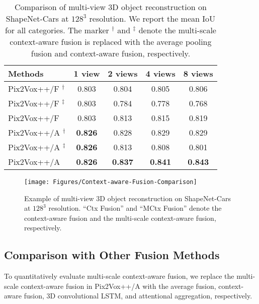 \documentclass[twocolumn]{svjour3}
\begin{document}
\begin{table}[!t]
  \centering
  \caption{Comparison of multi-view 3D object reconstruction on ShapeNet-Cars at $128^3$ resolution. We report the mean IoU for all categories. The marker $^\dag$ and $^\ddag$ denote the multi-scale context-aware fusion is replaced with the average pooling fusion and context-aware fusion, respectively.}
  \begin{tabularx}{\linewidth}{lcccc}
    \toprule
    Methods        & 1 view    & 2 views   & 4 views   & 8 views\\
    \midrule
    Pix2Vox++/F $^\dag$
                   & 0.803     & 0.804     & 0.805     & 0.806 \\
    Pix2Vox++/F $^\ddag$
                   & 0.803     & 0.784     & 0.778     & 0.768 \\
    Pix2Vox++/F    & 0.803     & 0.813     & 0.815     & 0.819 \\
    \midrule
    Pix2Vox++/A $^\dag$
                   & \bf{0.826}& 0.828     & 0.829     & 0.829 \\
    Pix2Vox++/A $^\ddag$
                   & \bf{0.826}& 0.813     & 0.808     & 0.801 \\
    Pix2Vox++/A    & \bf{0.826}& \bf{0.837}& \bf{0.841}& \bf{0.843}\\
    \bottomrule
  \end{tabularx}
  \label{tab:shapenet-context-aware-fusion-high-resolution}
\end{table}

\begin{figure}
  \resizebox{\linewidth}{!} {
    \texttt{[image: Figures/Context-aware-Fusion-Comparison]}
  }
  \caption{Example of multi-view 3D object reconstruction on ShapeNet-Cars at $128^3$ resolution. ``Ctx Fusion'' and ``MCtx Fusion'' denote the context-aware fusion and the multi-scale context-aware fusion, respectively.}
  \label{fig:multi-scale-context-aware-fusion-comparison}
\end{figure}

\subsection{Comparison with Other Fusion Methods}

To quantitatively evaluate multi-scale context-aware fusion, we replace the multi-scale context-aware fusion in Pix2Vox++/A with the average fusion, context-aware fusion, 3D convolutional LSTM, and attentional aggregation, respectively.
\end{document}
